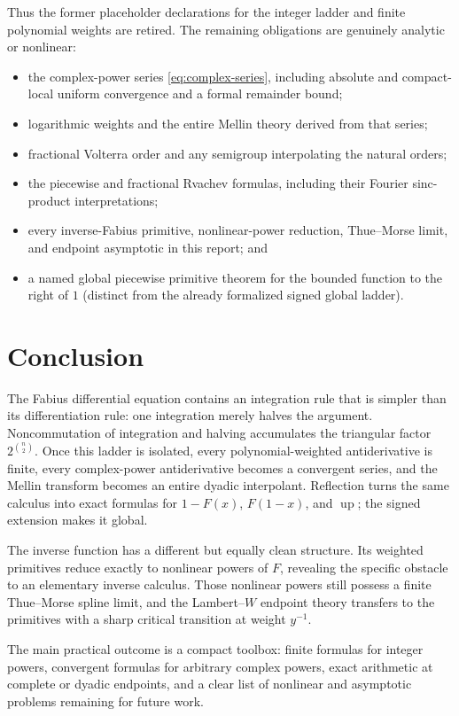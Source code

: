 \documentclass[11pt,oneside]{article}
\numberwithin{equation}{section}
\theoremstyle{definition}
\theoremstyle{remark}
\newcommand{\Up}{\operatorname{up}}
\begin{document}
Thus the former placeholder declarations for the integer ladder and finite
polynomial weights are retired.  The remaining obligations are genuinely
analytic or nonlinear:
\begin{itemize}
\item the complex-power series \eqref{eq:complex-series}, including absolute
and compact-local uniform convergence and a formal remainder bound;
\item logarithmic weights and the entire Mellin theory derived from that
series;
\item fractional Volterra order and any semigroup interpolating the natural
orders;
\item the piecewise and fractional Rvachev formulas, including their Fourier
sinc-product interpretations;
\item every inverse-Fabius primitive, nonlinear-power reduction, Thue--Morse
limit, and endpoint asymptotic in this report; and
\item a named global piecewise primitive theorem for the bounded function to
the right of $1$ (distinct from the already formalized signed global ladder).
\end{itemize}

\section{Conclusion}
\label{sec:conclusion}

The Fabius differential equation contains an integration rule that is simpler
than its differentiation rule: one integration merely halves the argument.
Noncommutation of integration and halving accumulates the triangular factor
$2^{\binom n2}$.  Once this ladder is isolated, every polynomial-weighted
antiderivative is finite, every complex-power antiderivative becomes a
convergent series, and the Mellin transform becomes an entire dyadic
interpolant.  Reflection turns the same calculus into exact formulas for
$1-F(x)$, $F(1-x)$, and $\Up$; the signed extension makes it global.

The inverse function has a different but equally clean structure.  Its
weighted primitives reduce exactly to nonlinear powers of $F$, revealing the
specific obstacle to an elementary inverse calculus.  Those nonlinear powers
still possess a finite Thue--Morse spline limit, and the Lambert--$W$ endpoint
theory transfers to the primitives with a sharp critical transition at weight
$y^{-1}$.

The main practical outcome is a compact toolbox: finite formulas for integer
powers, convergent formulas for arbitrary complex powers, exact arithmetic at
complete or dyadic endpoints, and a clear list of nonlinear and asymptotic
problems remaining for future work.
\end{document}
